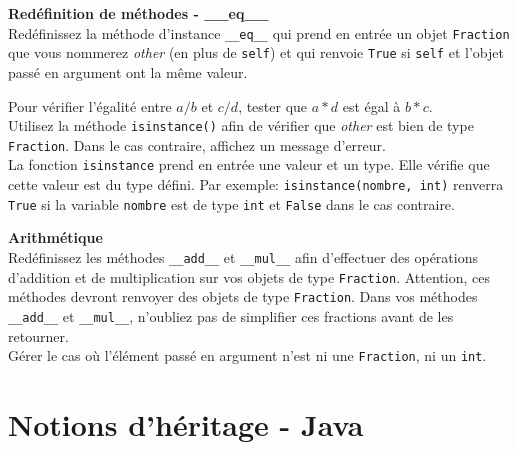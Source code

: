 \begin{Exercice}[15 minutes] \textbf{Redéfinition de méthodes - \_\_eq\_\_}\\
	Redéfinissez la méthode d'instance \lstinline{__eq__} qui prend en entrée un objet \lstinline{Fraction} que vous nommerez \textit{other} (en plus de \lstinline{self}) et qui renvoie \lstinline{True} si \lstinline{self} et l'objet passé en argument ont la même valeur.
	\begin{conseil}
		Pour vérifier l'égalité entre $a/b$ et $c/d$, tester que $a*d$ est égal à $b*c$. \\
		Utilisez la méthode \lstinline{isinstance()} afin de vérifier que \textit{other} est bien de type \lstinline{Fraction}. Dans le cas contraire, affichez un message d'erreur.
		\\La fonction \lstinline{isinstance} prend en entrée une valeur et un type. Elle vérifie que cette valeur est du type défini. Par exemple: \lstinline{isinstance(nombre, int)} renverra \lstinline{True} si la variable \lstinline{nombre} est de type \lstinline{int} et \lstinline{False} dans le cas contraire.
	\end{conseil}
\end{Exercice}

\begin{Exercice}[15 minutes] \textbf{Arithmétique}\\
	Redéfinissez les méthodes \lstinline{__add__} et \lstinline{__mul__} afin d'effectuer des opérations d'addition et de multiplication sur vos objets de type \lstinline{Fraction}. Attention, ces méthodes devront renvoyer des objets de type \lstinline{Fraction}. Dans vos méthodes \lstinline{__add__} et \lstinline{__mul__}, n'oubliez pas de simplifier ces fractions avant de les retourner.\\
	Gérer le cas où l'élément passé en argument n'est ni une \lstinline{Fraction}, ni un \lstinline{int}.
\end{Exercice}


\begin{solution}
	
\end{solution}
\begin{solution}
	
\end{solution}

\newpage
\section{Notions d'héritage - Java}


